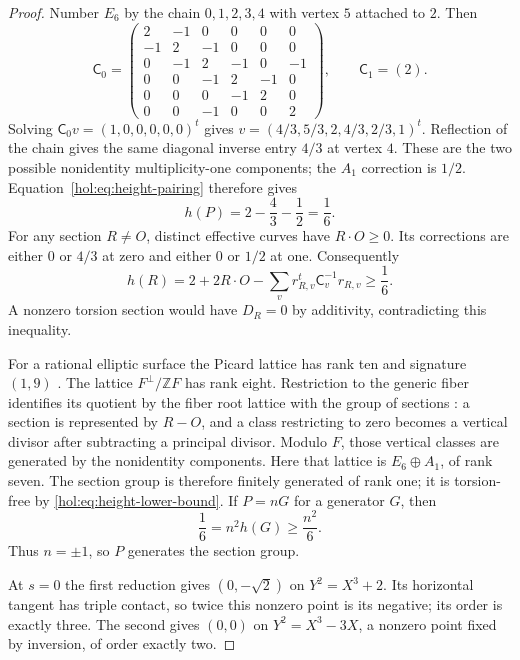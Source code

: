 \documentclass[11pt]{article}
\numberwithin{equation}{section}
\begin{document}
\begin{proof}
Number $E_6$ by the chain $0,1,2,3,4$ with vertex $5$ attached
to $2$. Then
\[
 \mathsf C_0=
 \begin{pmatrix}
 2&-1&0&0&0&0\\
 -1&2&-1&0&0&0\\
 0&-1&2&-1&0&-1\\
 0&0&-1&2&-1&0\\
 0&0&0&-1&2&0\\
 0&0&-1&0&0&2
 \end{pmatrix},
 \qquad \mathsf C_1=(2).
\]
Solving $\mathsf C_0v=(1,0,0,0,0,0)^t$ gives
$v=(4/3,5/3,2,4/3,2/3,1)^t$. Reflection of the chain gives
the same diagonal inverse entry $4/3$ at vertex $4$.
These are the two possible nonidentity multiplicity-one components;
the $A_1$ correction is $1/2$. Equation~\eqref{hol:eq:height-pairing}
therefore gives
\[
 h(P)=2-\frac43-\frac12=\frac16.
\]
For any section $R\ne O$, distinct effective curves have
$R\cdot O\geq0$. Its corrections are either $0$ or $4/3$ at
zero and either $0$ or $1/2$ at one. Consequently
\begin{equation}\label{hol:eq:height-lower-bound}
 h(R)=2+2R\cdot O
       -\sum_v r_{R,v}^{t}\mathsf C_v^{-1}r_{R,v}
       \geq\frac16.
\end{equation}
A nonzero torsion section would have $D_R=0$ by additivity,
contradicting this inequality.

For a rational elliptic surface the Picard lattice has rank ten
and signature $(1,9)$ \cite[\S1.1.3]{DolgachevMartin}.
The lattice $F^\perp/\mathbb ZF$ has rank eight. Restriction to
the generic fiber identifies its quotient by the fiber root
lattice with the group of sections
\cite[Lemma~5.1]{DolgachevMartin}: a section is represented by
$R-O$, and a class restricting to zero becomes a vertical divisor
after subtracting a principal divisor. Modulo $F$, those vertical
classes are generated by the nonidentity components. Here that
lattice is $E_6\oplus A_1$, of rank seven. The section group is
therefore finitely generated of rank one; it is torsion-free by
\eqref{hol:eq:height-lower-bound}. If $P=nG$ for a generator $G$,
then
\[
 \frac16=n^2h(G)\geq\frac{n^2}{6}.
\]
Thus $n=\pm1$, so $P$ generates the section group.

At $s=0$ the first reduction gives $(0,-\sqrt2)$ on
$Y^2=X^3+2$. Its horizontal tangent has triple contact, so twice
this nonzero point is its negative; its order is exactly three.
The second gives $(0,0)$ on $Y^2=X^3-3X$, a nonzero point fixed
by inversion, of order exactly two.
\end{proof}
\end{document}
